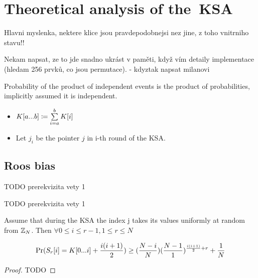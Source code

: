 \chapter{Theoretical analysis of the~KSA}

Hlavni myslenka, nektere klice jsou pravdepodobnejsi nez jine, z toho vnitrniho stavu!! 


Nekam napsat, ze to jde snadno ukrást v paměti, když vím detaily implementace (hledam 256 prvků, co jsou permutace). - kdyztak napsat milanovi




\begin{thm}
	Probability of the product of independent events is the product of probabilities, implicitly assumed it is independent. 
\end{thm}


\begin{notation}
	
	\begin{itemize}
		\item 	$ K[{a}...{b}] \coloneqq \sum\limits_{i=a}^{b}K[i]$
		
		\item 	Let $ j_{i} $ be the pointer $ j $ in i-th round of the KSA. 
	\end{itemize}
	
\end{notation}

\section{Roos bias}
	\begin{lemma}
		TODO prerekvizita vety 1
	\end{lemma}
	
	\begin{lemma}
		TODO prerekvizita vety 1
	\end{lemma}
	
	
	\begin{thm}{\cite{GoMa}}
		Assume that during the KSA the index j takes its values uniformly at random from $ \mathbb{Z}_{N} $. Then $ \forall 0 \leq i \leq r-1, 1 \leq r \leq N $
		
		\[ \Pr(S_{r}[i] = K[{0}...{i}] + \dfrac{i(i+1)}{2})   \geq (\dfrac{N - i}{N})(\dfrac{N-1}{1})^{\frac{i(i+1)}{2}+r}+\dfrac{1}{N} \]
	\end{thm}
	
	\begin{proof}
		TODO
	\end{proof}
	
